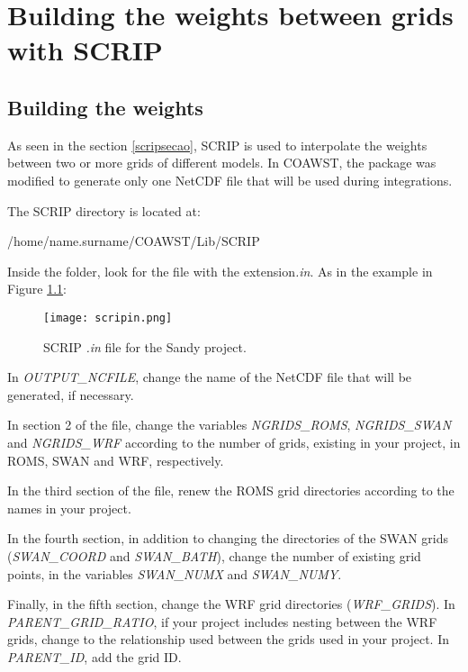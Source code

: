 \chapter{Building the weights between grids with SCRIP}
\bigskip
\section{Building the weights}
\bigskip
 As seen in the section \textcolor{bleu_cite}{\ref{scripsecao}}, SCRIP is used to interpolate the weights between two or more grids of different models. 
In COAWST, the package was modified to generate only one NetCDF file that will be used during integrations.
\bigskip

 The SCRIP directory is located at:
\bigskip

\begin{bashcode}
/home/name.surname/COAWST/Lib/SCRIP
\end{bashcode}
\bigskip

 Inside the folder, look for the file with the extension\textit{.in}. As in the example in Figure \textcolor{bleu_cite}{\ref{scripinnedit}}:

\begin{figure}[H]
    \centering
    \texttt{[image: scripin.png]}
    \caption{SCRIP \textit{.in} file for the Sandy project.}
    \label{scripinnedit}
\end{figure}
\bigskip

 In \textit{OUTPUT\_NCFILE}, change the name of the NetCDF file that will be generated, if necessary.
\bigskip

 In section 2 of the file, change the variables \textit{NGRIDS\_ROMS}, \textit{NGRIDS\_SWAN} and \textit{NGRIDS\_WRF} according to the number of grids, 
existing in your project, in ROMS, SWAN and WRF, respectively.
\bigskip

 In the third section of the file, renew the ROMS grid directories according to the names in your project.
\bigskip

 In the fourth section, in addition to changing the directories of the SWAN grids (\textit{SWAN\_COORD} and \textit{SWAN\_BATH}), change the 
number of existing grid points, in the variables \textit {SWAN\_NUMX} and \textit{SWAN\_NUMY}.
\bigskip

 Finally, in the fifth section, change the WRF grid directories (\textit{WRF\_GRIDS}). In \textit {PARENT\_GRID\_RATIO}, if your project includes nesting 
between the WRF grids, change to the relationship used between the grids used in your project. In \textit{PARENT\_ID}, add the grid ID.
\bigskip

